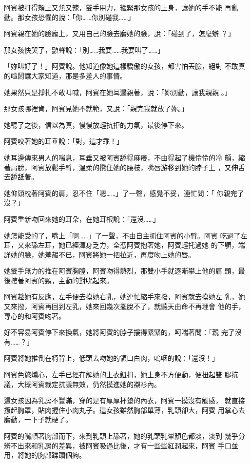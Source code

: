 阿賓被打得頰上又熱又辣，雙手用力，箍緊那女孩的上身，讓她的手不能
再亂動。那女孩恐懼的說：「你……你別碰我……」

阿賓親在她的臉龐上，又用自己的臉去磨她的臉，說：「碰到了，怎麼辦
？」

那女孩快哭了，顫聲說：「別……我要……我要叫了……」

「妳叫好了！」阿賓說。他知道像她這樣驕傲的女孩，都害怕丟臉，絕對
不敢真的喧鬧讓大家知道，那是多羞人的事情。

她果然只是掙扎不敢叫喊，阿賓在她耳邊親著，說：「妳別動，讓我親親
。」

那女孩哪裡肯，阿賓見她不就範，又說：「親完我就放了妳。」

她聽了之後，信以為真，慢慢放輕抗拒的力氣，最後停下來。

阿賓咬著她的耳垂說：「對，這才乖！」

她耳邊傳來男人的喘息，耳垂又被阿賓舔得麻癢，不由得起了機伶伶的冷
顫，縮著肩膀，阿賓放鬆手臂，溫柔的攬住她的腰枝，嘴唇游移到她的脖子上
，又伸舌去舔舐著。

她仰頭枕著阿賓的肩，忍不住「嗯……」了一聲，感覺不妥，連忙問：「
你親完了沒？」

阿賓重新吻回來她的耳朵，在她耳根說：「還沒……」

她怎能受的了，嘴上「啊……」了一聲，不由自主抓住阿賓的小臂。阿賓
吃過了左耳，又來舔左耳，她已經渾身乏力，全憑阿賓抱著她，阿賓輕托過她
的下顎，端詳她的臉，她羞赧不已，阿賓將她一把拉近，再度吻上她的唇。

她雙手無力的推在阿賓胸膛，阿賓吻得熱烈，那雙小手就逐漸攀上他的肩
頭，最後摟著阿賓的頸，主動的對吮起來。

阿賓趁她有反應，左手便去摸她右乳，她連忙縮手來撥，阿賓就去摸她左
乳，她又來撥，阿賓再回到左乳，她來回幾次擺脫不了，就聽天由命不再理會
他的手，專心的和阿賓吻著。

好不容易阿賓停下來換氣，她將阿賓的脖子摟得緊緊的，呵喘著問：「親
完了沒有……？」

阿賓將她推倒在椅背上，低頭去吻她的領口白肉，嗚咽的說：「還沒！」

阿賓色慾燻心，左手已經在解她的上衣鈕扣，她上身不方便動，便扭起雙
腿抗議，大概阿賓裁定抗議無效，仍然摸進她的襯衫內。

這女孩因為乳房不豐滿，穿的是有厚厚杯墊的內衣，阿賓一摸沒有觸感，
就直接撩起胸罩，貼肉握住小肉丸子。這女孩雖然胸部單薄，乳頭卻大，阿賓
用掌心去磨動，一下子就硬了。

阿賓的嘴順著胸部而下，來到乳頭上舔著，她的乳頭乳暈顏色都淡，淡到
幾乎分辨不出來和乳房的差異，被阿賓吸過比後，才有一些些紅潤起來，阿賓
手口並用，將她的胸部蹂躪個夠。

